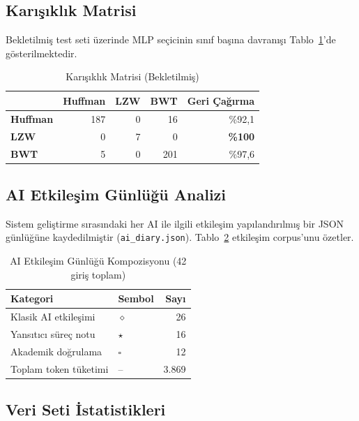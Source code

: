 \documentclass[conference]{IEEEtran}
\begin{document}
\subsection{Karışıklık Matrisi}

Bekletilmiş test seti üzerinde MLP seçicinin sınıf başına davranışı Tablo~\ref{tab:confusion}'de gösterilmektedir.

\begin{table}[h]
\caption{Karışıklık Matrisi (Bekletilmiş)}
\label{tab:confusion}
\centering
\begin{tabular}{@{}lrrrr@{}}
\toprule
& Huffman & LZW & BWT & Geri Çağırma \\
\midrule
\textbf{Huffman} & 187 & 0 & 16 & \%92,1 \\
\textbf{LZW} & 0 & 7 & 0 & \textbf{\%100} \\
\textbf{BWT} & 5 & 0 & 201 & \%97,6 \\
\bottomrule
\end{tabular}
\end{table}

\subsection{AI Etkileşim Günlüğü Analizi}

Sistem geliştirme sırasındaki her AI ile ilgili etkileşim yapılandırılmış bir JSON günlüğüne kaydedilmiştir (\texttt{ai\_diary.json}). Tablo~\ref{tab:ai_log} etkileşim corpus'unu özetler.

\begin{table}[h]
\caption{AI Etkileşim Günlüğü Kompozisyonu (42 giriş toplam)}
\label{tab:ai_log}
\centering
\begin{tabular}{@{}llr@{}}
\toprule
Kategori & Sembol & Sayı \\
\midrule
Klasik AI etkileşimi & \(\diamond\) & 26 \\
Yansıtıcı süreç notu & \(\star\) & 16 \\
Akademik doğrulama & \(\square\) & 12 \\
\midrule
Toplam token tüketimi & -- & 3.869 \\
\bottomrule
\end{tabular}
\end{table}

\subsection{Veri Seti İstatistikleri}
\end{document}
